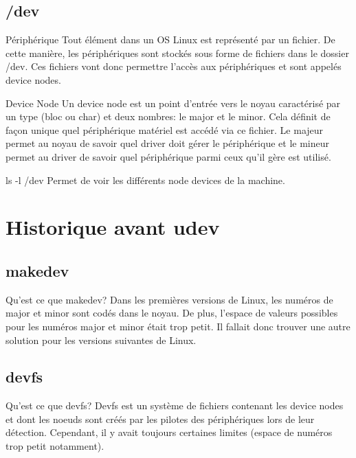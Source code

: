 \documentclass{beamer}
\begin{document}
\subsection{/dev}
 \begin{frame}
	\begin{block}{Périphérique} 
		Tout élément dans un OS Linux est représenté par un fichier. De cette manière, les périphériques sont stockés sous forme de fichiers dans le dossier /dev.
		Ces fichiers vont donc permettre l’accès aux périphériques et sont appelés device nodes. 
	\end{block}
\end{frame}
\begin{frame}
    \begin{block}{Device Node}
    	Un device node est un point d’entrée vers le noyau caractérisé par un type (bloc ou char) et deux nombres: le major et le minor. Cela définit de façon unique quel périphérique matériel est accédé via ce fichier. Le majeur permet au noyau de savoir quel driver doit gérer le périphérique et le mineur permet au driver de savoir quel périphérique parmi ceux qu’il gère est utilisé. 
    \end{block}
	\begin{exampleblock}{ls -l /dev} 
		 Permet de voir les différents node devices de la machine.
	\end{exampleblock}
\end{frame}

\section{Historique avant udev}

\subsection{makedev}
\begin{frame}
\begin{block}{Qu'est ce que makedev?} 
	Dans les premières versions de Linux, les numéros de major et minor sont codés dans le noyau. De plus, l'espace de valeurs possibles pour les numéros major et minor était trop petit. 
	Il fallait donc trouver une autre solution pour les versions suivantes de Linux.
\end{block}
\end{frame}

\subsection{devfs}
\begin{frame}
\begin{block}{Qu'est ce que devfs?} 
	Devfs est un système de fichiers contenant les device nodes et dont les noeuds sont créés par les pilotes des périphériques lors de leur détection. Cependant, il y avait toujours certaines limites (espace de numéros trop petit notamment).
\end{block}
\end{frame}
\end{document}
